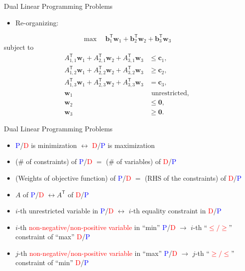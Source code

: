 \documentclass[aspectratio=169,hyperref,UTF8,CJK]{beamer}
\newcommand{\trans}{\mathsf{T}}
\newcommand{\vect}[1]{\boldsymbol{#1}}
\begin{document}
\begin{frame}{Dual Linear Programming Problems}
  \small
  \begin{itemize}
    \item Re-organizing:
  \end{itemize}
  \begin{equation*}
    \max\quad \vect{b}_1^{\trans}\vect{w}_1+
    \vect{b}_2^{\trans}\vect{w}_2+
    \vect{b}_3^{\trans}\vect{w}_3
  \end{equation*}
  subject to
  \begin{align*}
    A_{1,1}^{\trans}\vect{w}_1+A_{2,1}^{\trans}\vect{w}_2+A_{3,1}^{\trans}\vect{w}_3&\le\vect{c}_1,\\
    A_{1,2}^{\trans}\vect{w}_1+A_{2,2}^{\trans}\vect{w}_2+A_{3,2}^{\trans}\vect{w}_3&\ge\vect{c}_2,\\
    A_{1,3}^{\trans}\vect{w}_1+A_{2,3}^{\trans}\vect{w}_2+A_{3,3}^{\trans}\vect{w}_3&=\vect{c}_3,\\
    \vect{w}_1&\text{ unrestricted},\\
    \vect{w}_2&\le\vect{0},\\
    \vect{w}_3&\ge\vect{0}.
  \end{align*}
\end{frame}

\begin{frame}{Dual Linear Programming Problems}
  \small
  \begin{itemize}
    \item \textcolor{blue}{P}/\textcolor{red}{D} is minimization $\longleftrightarrow$ \textcolor{red}{D}/\textcolor{blue}{P} is maximization
    \item (\# of constraints) of \textcolor{blue}{P}/\textcolor{red}{D} $=$ (\# of variables) of \textcolor{red}{D}/\textcolor{blue}{P}
    \item (Weights of objective function) of \textcolor{blue}{P}/\textcolor{red}{D} $=$ (RHS of the constraints) of \textcolor{red}{D}/\textcolor{blue}{P}
    \item $A$ of \textcolor{blue}{P}/\textcolor{red}{D} $\longleftrightarrow A^{\trans}$ of \textcolor{red}{D}/\textcolor{blue}{P}
    \item $i$-th unrestricted variable in \textcolor{blue}{P}/\textcolor{red}{D} $\longleftrightarrow$ $i$-th equality constraint in \textcolor{red}{D}/\textcolor{blue}{P}
    \item $i$-th \textcolor{red}{non-negative/non-positive variable} in ``min'' \textcolor{blue}{P}/\textcolor{red}{D} $\longrightarrow$ $i$-th ``\textcolor{red}{$\le/\ge$}'' constraint of ``max'' \textcolor{red}{D}/\textcolor{blue}{P}
    \item $j$-th \textcolor{red}{non-negative/non-positive variable} in ``max'' \textcolor{blue}{P}/\textcolor{red}{D} $\longrightarrow$ $j$-th ``\textcolor{red}{$\ge/\le$}'' constraint of ``min'' \textcolor{red}{D}/\textcolor{blue}{P}
  \end{itemize}
\end{frame}
\end{document}
